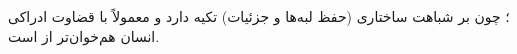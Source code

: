 ؛ چون بر شباهت ساختاری (حفظ لبه‌ها و جزئیات) تکیه دارد و معمولاً با قضاوت ادراکی انسان هم‌خوان‌تر از  است.
